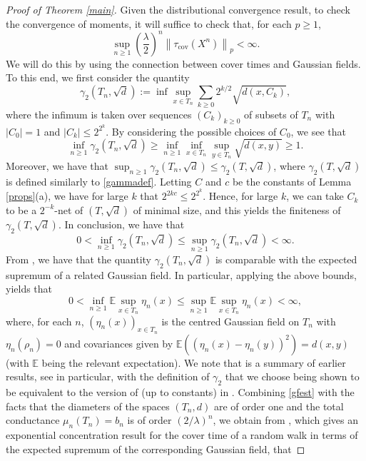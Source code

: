 \documentclass[a4paper, 11pt]{article}
\begin{document}
\begin{proof}[Proof of Theorem \ref{main}]
Given the distributional convergence result, to check the convergence of moments, it will suffice to check that, for each $p\geq 1$,
\begin{equation}\label{mombound}
\sup_{n\geq 1}\left(\frac{\lambda}{2}\right)^n\left\|\tau_{\mathrm{cov}}(X^n)\right\|_{p}<\infty.
\end{equation}
We will do this by using the connection between cover times and Gaussian fields. To this end, we first consider the quantity
\begin{equation}\label{gammadef}
\gamma_2\left(T_n,\sqrt{d}\right):=\inf\sup_{x\in T_n}\sum_{k\geq 0}2^{k/2}\sqrt{d(x,C_k)},
\end{equation}
where the infimum is taken over sequences $(C_k)_{k\geq 0}$ of subsets of $T_n$ with $|C_0|=1$ and $|C_k|\leq {2^{2^k}}$. By considering the possible choices of $C_0$, we see that \[\inf_{n\geq 1} \gamma_2\left(T_n,\sqrt{d}\right) \geq \inf_{n\geq 1}\inf_{x\in T_n}\sup_{y\in T_n}\sqrt{d(x,y)} \geq 1.\]
Moreover, we have that $\sup_{n\geq 1}\gamma_2(T_n,\sqrt{d})\leq \gamma_2(T,\sqrt{d})$, where $\gamma_2(T,\sqrt{d})$ is defined similarly to \eqref{gammadef}. Letting $C$ and $c$ be the constants of Lemma \ref{props}(a), we have for large $k$ that $2^{2kc}\leq 2^{2^k}$. Hence, for large $k$, we can take $C_k$ to be a $2^{-k}$-net of $(T,\sqrt{d})$ of minimal size, and this yields the finiteness of $\gamma_2(T,\sqrt{d})$. In conclusion, we have that
\[0<\inf_{n\geq 1} \gamma_2\left(T_n,\sqrt{d}\right)\leq \sup_{n\geq 1} \gamma_2\left(T_n,\sqrt{d}\right)<\infty.\]
From \cite[Theorem MM]{DLP}, we have that the quantity $\gamma_2(T_n,\sqrt{d})$ is comparable with the expected supremum of a related Gaussian field. In particular, applying the above bounds, \cite[Theorem MM]{DLP} yields that
\begin{equation}\label{gfest}
0<\inf_{n\geq 1} \mathbb{E}\sup_{x\in T_n}\eta_n(x)\leq \sup_{n\geq 1} \mathbb{E}\sup_{x\in T_n}\eta_n(x)<\infty,
\end{equation}
where, for each $n$, $(\eta_n(x))_{x\in T_n}$ is the centred Gaussian field on $T_n$ with $\eta_n(\rho_n)=0$ and covariances given by $\mathbb{E}((\eta_n(x)-\eta_n(y))^2)=d(x,y)$ (with $\mathbb{E}$ being the relevant expectation). We note that \cite[Theorem MM]{DLP} is a summary of earlier results, see \cite{Tala} in particular, with the definition of $\gamma_2$ that we choose being shown to be equivalent to the version of \cite{DLP} (up to constants) in \cite{Tala2}. Combining \eqref{gfest} with the facts that the diameters of the spaces $(T_n,d)$ are of order one and the total conductance $\mu_n(T_n)=b_n$ is of order $(2/\lambda)^n$, we obtain from \cite{Zhai}, which gives an exponential concentration result for the cover time of a random walk in terms of the expected supremum of the corresponding Gaussian field, that

\end{proof}
\end{document}
